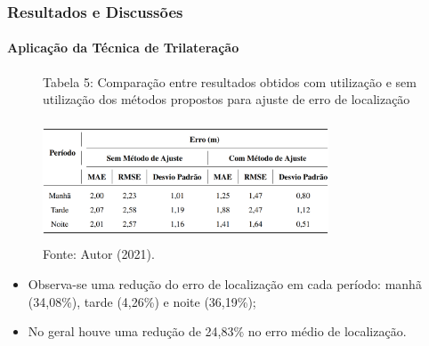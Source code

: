\documentclass[xcolor={dvipsnames,svgnames,table}]{beamer}
\begin{document}
	\begin{frame}
		\frametitle{Resultados e Discussões}
		\framesubtitle{Aplicação da Técnica de Trilateração}
		\begin{figure}
			\caption*{Tabela 5: Comparação entre resultados obtidos com utilização e sem utilização dos métodos propostos para ajuste de erro de localização}
			\vspace{-5pt}
			\centering
			\includegraphics[width=8.5cm, height=3.6cm]{imgs/comparacao-metodos.PNG}
			\vspace{-5pt}
			\caption*{\tiny{Fonte: Autor (2021).}}
			\vspace{-15pt}
		\end{figure}
		
		\begin{block}{}%
			\begin{itemize}[label=\textcolor{black}{\textbullet}, left=5pt]
				\justifying
				\item Observa-se uma redução do erro de localização em cada período: manhã (34,08\%), tarde (4,26\%) e noite (36,19\%);
				\item No geral houve uma redução de 24,83\% no erro médio
				de localização.%
			\end{itemize}
		\end{block}
		
	\end{frame}
\end{document}
